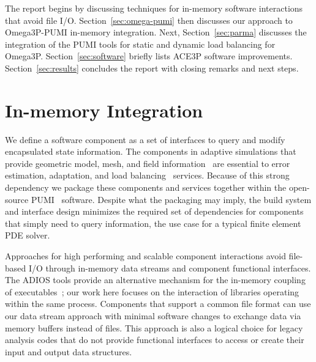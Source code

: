 \documentclass[a4paper]{article}
\begin{document}
The report begins by discussing techniques for in-memory software interactions
that avoid file I/O.
Section~\ref{sec:omega-pumi} then discusses our approach to Omega3P-PUMI
in-memory integration.
Next, Section~\ref{sec:parma} discusses the integration of the PUMI tools
for static and dynamic load balancing for Omega3P.
Section~\ref{sec:software} briefly lists ACE3P software improvements.
Section~\ref{sec:results} concludes the report with closing remarks and next
steps.

\section{In-memory Integration}\label{sec:inmem}

We define a software component as a set of interfaces to query and modify
encapsulated state information.
The components in adaptive simulations that provide geometric model, mesh, and
field information~\cite{BeaWal,ibanez2015pumi,Ollivier10} are essential to error
estimation, adaptation, and load balancing~\cite{SmithParma2015} services.
Because of this strong dependency we package these components and services
together within the open-source PUMI~\cite{ibanez2015pumi} software.
Despite what the packaging may imply, the build system and interface design
minimizes the required set of dependencies for components that simply need to
query information, the use case for a typical finite element PDE solver.

Approaches for high performing and scalable component interactions avoid
file-based I/O through in-memory data streams and component functional
interfaces.
The ADIOS tools provide an alternative mechanism for the in-memory coupling of
executables~\cite{bennett2012combining,zhang2012enabling}; our work here focuses
on the interaction of libraries operating within the same process.
Components that support a common file format can use our data stream approach
with minimal software changes to exchange data via memory buffers instead of files.
This approach is also a logical choice for legacy analysis codes that do not
provide functional interfaces to access or create their input and output data
structures.
\end{document}
